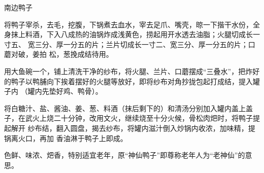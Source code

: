 %
%
%
%
%
%
%
\begin{recipe}[神仙鸭子]{南边鸭子}

\ingredients


\preparation

\step 将鸭子宰杀，去毛，挖腹，下锅煮去血水，宰去足爪、嘴壳，晾一下揩干水份，全
身抹上料酒，下入八成热的油锅炸成浅黄色，捞起用开水透去油脂；火腿切成长一寸五、
宽三分、厚一分五的片；兰片切成长一寸二、宽三分、厚一分五的片；口蘑对破，姜拍
松，葱挽成结待用。

\step 用大鱼碗一个，铺上清洗干净的纱布，将火腿、兰片、口蘑摆成“三叠水”，把炸好
的鸭子以鸭脯向下挨着摆好的火腿等放好，即将纱布对角抄拢包起打成结，提入罐子内
（罐内先垫好鸡、鸭骨）。

\step 将白糖汁、盐、酱油、姜、葱、料酒（抹后剩下的）和清汤分别加入罐内盖上盖
子，在武火上烧二十分钟，改用文火，继续烧至十分火候，骨松肉𤆵时，将鸭子提起解开
纱布结，翻入圆盘，揭去纱布，将罐内滋汁倒入炒锅内收浓，加味精，提锅离火口，再加
香油淋于鸭子上即成。

\features

色鲜、味浓、𤆵香，特别适宜老年，原“神仙鸭子”即尊称老年人为“老神仙”的意思。

\end{recipe}

